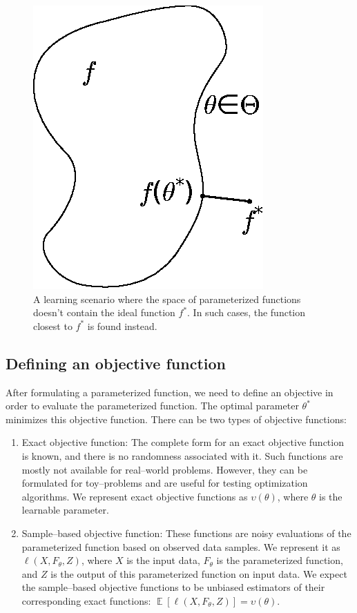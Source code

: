 \documentclass[twoside]{article}
\DeclareMathOperator{\E}{\mathbb{E}}
\begin{document}
\begin{figure}[!hbp]
  \centering
  \includegraphics[scale=0.7]{images/function_space.eps}
  \caption{A learning scenario where the space of parameterized functions doesn't contain the ideal function $f^*$. In such cases, the function closest to $f^*$ is found instead.}
  \label{fig: function_space}
\end{figure}

\subsection{Defining an objective function}
After formulating a parameterized function, we need to define an objective in order to evaluate the parameterized function. The optimal parameter $\theta^*$ minimizes this objective function. There can be two types of objective functions:
\begin{enumerate}
\item Exact objective function: The complete form for an exact objective function is known, and there is no randomness associated with it. Such functions are mostly not available for real--world problems. However, they can be formulated for toy--problems and are useful for testing optimization algorithms. We represent exact objective functions as $\upsilon(\theta)$, where $\theta$ is the learnable parameter.
\item Sample--based objective function: These functions are noisy evaluations of the parameterized function based on observed data samples. We represent it as $\ell(X, F_\theta, Z)$, where $X$ is the input data, $F_\theta$ is the parameterized function, and $Z$ is the output of this parameterized function on input data. We expect the sample--based objective functions to be unbiased estimators of their corresponding exact functions: $\E[\ell(X, F_\theta, Z)] = \upsilon(\theta)$.
\end{enumerate}
\end{document}
